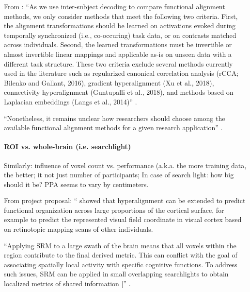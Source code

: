 

From \citet{bazeille2021empirical}: ``As we use inter-subject decoding to
compare functional alignment methods, we only consider methods that meet the
following two criteria.
%
First, the alignment transformations should be learned on activations evoked
during temporally synchronized (i.e., co-occuring) task data, or on contrasts
matched across individuals.
%
Second, the learned transformations must be invertible or almost invertible
linear mappings and applicable as-is on unseen data with a different task
structure.
%
These two criteria exclude several methods currently used in the literature such
as regularized canonical correlation analysis (rCCA; Bilenko and Gallant, 2016),
gradient hyperalignment (Xu et al., 2018), connectivity hyperalignment
(Guntupalli et al., 2018), and methods based on Laplacian embeddings (Langs et
al., 2014)'' \citep{bazeille2021empirical}.

%
``Nonetheless, it remains unclear how researchers should choose among the
available functional alignment methods for a given research application''
\citep{bazeille2021empirical}.




\paragraph{ROI vs. whole-brain (i.e. searchlight)}


%
Similarly: influence of voxel count vs. performance (a.k.a. the more training
data, the better; it not just number of participants;
%
In case of search light: how big should it be? PPA seems to vary by centimeters.

From project proposal: ``\citet{guntupalli2016model} showed that hyperalignment
can be extended to predict functional organization across large proportions of
the cortical surface, for example to predict the represented visual field
coordinate in visual cortex based on retinotopic mapping scans of other
individuals.

%
``Applying SRM to a large swath of the brain means that all voxels within the
region contribute to the final derived metric. This can conflict with the goal
of associating spatially local activity with specific cognitive functions. To
address such issues, SRM can be applied in small overlapping searchlights to
obtain localized metrics of shared information [\citep{guntupalli2016model,
zhang2016searchlight}'' \citep{cohen2017computational}.

